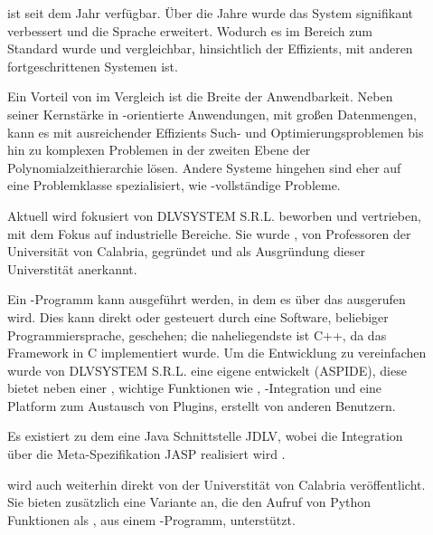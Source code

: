 \begin{description}
    \item[] ist seit dem Jahr  verfügbar.
    Über die Jahre wurde das System signifikant verbessert und die Sprache erweitert.
    Wodurch es im Bereich  zum Standard wurde und vergleichbar, \insb hinsichtlich der Effizients, mit anderen fortgeschrittenen  Systemen ist.

    Ein Vorteil von  im Vergleich ist die Breite der Anwendbarkeit.
    Neben seiner Kernstärke in -orientierte Anwendungen, mit großen Datenmengen, kann es mit ausreichender Effizients  Such- und Optimierungsproblemen bis hin zu komplexen Problemen in der zweiten Ebene der Polynomialzeithierarchie lösen.
    Andere Systeme hingehen sind eher auf eine Problemklasse spezialisiert, wie \zB {}-vollständige Probleme.

    Aktuell wird  fokusiert von DLVSYSTEM S.R.L. beworben und vertrieben, mit dem Fokus auf industrielle Bereiche.
    Sie wurde , von Professoren der Universität von Calabria, gegründet und  als Ausgründung dieser Universtität anerkannt.

    Ein -Programm kann ausgeführt werden, in dem es über das  ausgerufen wird.
    Dies kann direkt oder gesteuert durch eine Software, beliebiger Programmiersprache, geschehen;
    die naheliegendste ist C++, da das Framework in C implementiert wurde.
    Um die Entwicklung zu vereinfachen wurde von DLVSYSTEM S.R.L. eine eigene  entwickelt (ASPIDE), diese bietet neben einer , wichtige Funktionen wie , -Integration und eine Platform zum Austausch von Plugins, erstellt von anderen Benutzern.

    Es existiert zu dem eine Java Schnittstelle JDLV, wobei die Integration über die Meta-Spezifikation JASP realisiert wird .

     wird auch weiterhin direkt von der Universtität von Calabria veröffentlicht.
    Sie bieten zusätzlich eine Variante an, die den Aufruf von Python Funktionen als , aus einem -Programm, unterstützt.


\end{description}
